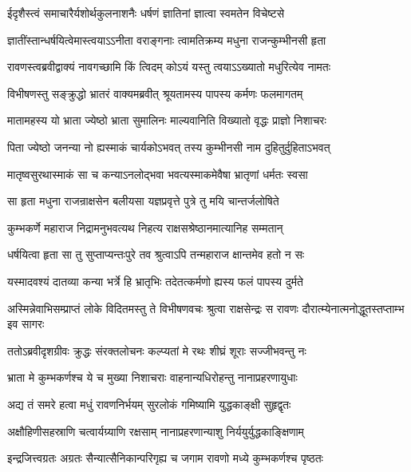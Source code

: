 \twolineshloka
{ईदृशैस्त्वं समाचारैर्यशोर्थकुलनाशनैः}
{धर्षणं ज्ञातिनां ज्ञात्वा स्वमतेन विचेष्टसे} %

\twolineshloka
{ज्ञातींस्तान्धर्षयित्वेमास्त्वयाऽऽनीता वराङ्गनाः}
{त्वामतिक्रम्य मधुना राजन्कुम्भीनसी हृता} %

\twolineshloka
{रावणस्त्वब्रवीद्वाक्यं नावगच्छामि किं त्विदम्}
{कोऽयं यस्तु त्वयाऽऽख्यातो मधुरित्येव नामतः} %

\twolineshloka
{विभीषणस्तु सङ्क्रुद्धो भ्रातरं वाक्यमब्रवीत्}
{श्रूयतामस्य पापस्य कर्मणः फलमागतम्} %

\twolineshloka
{मातामहस्य यो भ्राता ज्येष्ठो भ्राता सुमालिनः}
{माल्यवानिति विख्यातो वृद्धः प्राज्ञो निशाचरः} %

\twolineshloka
{पिता ज्येष्ठो जनन्या नो ह्यस्माकं चार्यकोऽभवत्}
{तस्य कुम्भीनसी नाम दुहितुर्दुहिताऽभवत्} %

\twolineshloka
{मातृष्वसुरथास्माकं सा च कन्याऽनलोद्भवा}
{भवत्यस्माकमेवैषा भ्रातृणां धर्मतः स्वसा} %

\twolineshloka
{सा हृता मधुना राजन्राक्षसेन बलीयसा}
{यज्ञप्रवृत्ते पुत्रे तु मयि चान्तर्जलोषिते} %

\twolineshloka
{कुम्भकर्णे महाराज निद्रामनुभवत्यथ}
{निहत्य राक्षसश्रेष्ठानमात्यानिह सम्मतान्} %

\twolineshloka
{धर्षयित्वा हृता सा तु सुप्ताप्यन्तःपुरे तव}
{श्रुत्वाऽपि तन्महाराज क्षान्तमेव हतो न सः} %

\twolineshloka
{यस्मादवश्यं दातव्या कन्या भर्त्रे हि भ्रातृभिः}
{तदेतत्कर्मणो ह्यस्य फलं पापस्य दुर्मते} %

\threelineshloka
{अस्मिन्नेवाभिसम्प्राप्तं लोके विदितमस्तु ते}
{विभीषणवचः श्रुत्वा राक्षसेन्द्रः स रावणः}
{दौरात्म्येनात्मनोद्धूतस्तप्ताम्भ इव सागरः} %

\twolineshloka
{ततोऽब्रवीदृशग्रीवः क्रुद्धः संरक्तलोचनः}
{कल्प्यतां मे रथः शीघ्रं शूराः सज्जीभवन्तु नः} %

\twolineshloka
{भ्राता मे कुम्भकर्णश्च ये च मुख्या निशाचराः}
{वाहनान्यधिरोहन्तु नानाप्रहरणायुधाः} %

\twolineshloka
{अद्य तं समरे हत्वा मधुं रावणनिर्भयम्}
{सुरलोकं गमिष्यामि युद्धकाङ्क्षी सुहृद्वृतः} %

\twolineshloka
{अक्षौहिणीसहस्राणि चत्वार्यग्र्याणि रक्षसाम्}
{नानाप्रहरणान्याशु निर्ययुर्युद्धकाङ्क्षिणाम्} %

\twolineshloka
{इन्द्रजित्त्वग्रतः अग्रतः सैन्यात्सैनिकान्परिगृह्य च}
{जगाम रावणो मध्ये कुम्भकर्णश्च पृष्ठतः} %


